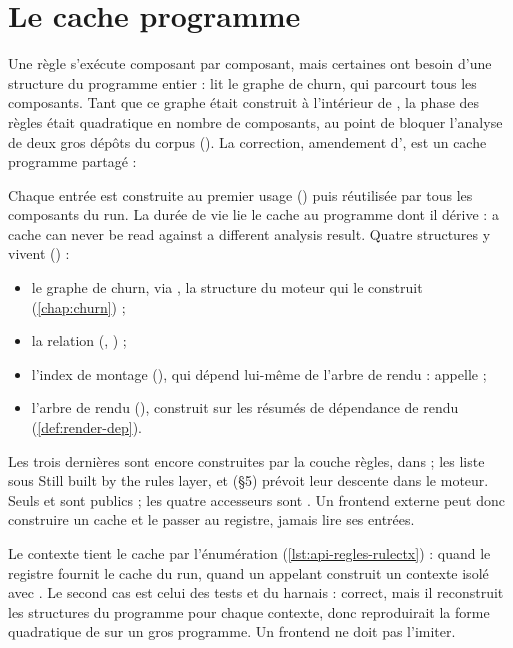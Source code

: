 \section{Le cache programme}
\label{sec:api-regles-cache}

Une règle s'exécute composant par composant, mais certaines ont besoin d'une structure du programme entier :  lit le graphe de churn, qui parcourt tous les composants. Tant que ce graphe était construit à l'intérieur de , la phase des règles était quadratique en nombre de composants, au point de bloquer l'analyse de deux gros dépôts du corpus (). La correction, amendement d', est un cache programme partagé :


Chaque entrée est construite au premier usage () puis réutilisée par tous les composants du run. La durée de vie  lie le cache au programme dont il dérive : \og a cache can never be read against a different analysis result\fg. Quatre structures y vivent () :
\begin{itemize}
  \item le graphe de churn, via , la structure du moteur qui le construit (\cref{chap:churn}) ;
  \item la relation  (, ) ;
  \item l'index de montage (), qui dépend lui-même de l'arbre de rendu :  appelle  ;
  \item l'arbre de rendu (), construit sur les résumés de dépendance de rendu (\cref{def:render-dep}).
\end{itemize}
Les trois dernières sont encore construites par la couche règles, dans  ;  les liste sous \og Still built by the rules layer\fg, et  (§5) prévoit leur descente dans le moteur. Seuls  et  sont publics ; les quatre accesseurs sont . Un frontend externe peut donc construire un cache et le passer au registre, jamais lire ses entrées.

Le contexte tient le cache par l'énumération  (\cref{lst:api-regles-rulectx}) :  quand le registre fournit le cache du run,  quand un appelant construit un contexte isolé avec . Le second cas est celui des tests et du harnais  : correct, mais il reconstruit les structures du programme pour chaque contexte, donc reproduirait la forme quadratique de  sur un gros programme. Un frontend ne doit pas l'imiter.

